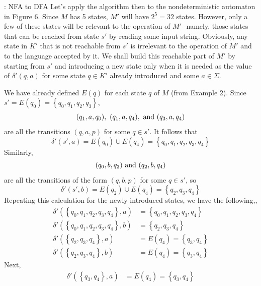 \begin{examplebreak}{: NFA to DFA}
  \quad Let's apply the algorithm then to the nondeterministic automaton in Figure 6. Since $M$ has 5 states, $M'$ will have $2^5 = 32$ states. However, only a few of these states will be relevant to the operation of $M'$ -namely, those states that can be reached from state $s'$ by reading some input string. Obviously, any state in $K'$ that is not reachable from $s'$ is irrelevant to the operation of $M'$ and to the language accepted by it. We shall build this reachable part of $M'$ by starting from $s'$ and introducing a new state only when it is needed as the value of $\delta'(q, a)$ for some state $q \in K'$ already introduced and some $a \in \Sigma$.
  
  \quad We have already defined $E(q)$ for each state $q$ of $M$ (from Example 2). Since $s' = E(q_0) = \left\{ q_0, q_1, q_2, q_3  \right\}$,
  \begin{equation*}
    (q_1, a, q_0),\ (q_1, a, q_4), \textnormal{ and } (q_3, a, q_4)
  \end{equation*}
  are all the transitions $(q, a, p)$ for some $q \in s'$. It follows that
  \begin{equation*}
    \delta'(s', a) = E(q_0) \cup E(q_4) = \left\{ q_0, q_1, q_2, q_3, q_4 \right\}
  \end{equation*}
  Similarly,
  \begin{equation*}
    (q_0, b, q_2) \textnormal{ and } (q_2, b, q_4)
  \end{equation*}
  are all the transitions of the form $(q, b, p)$ for some $q \in s'$, so
  \begin{equation*}
    \delta'(s', b) = E(q_2) \cup E(q_4) = \left\{ q_2, q_3, q_4 \right\}
  \end{equation*}
  Repeating this calculation for the newly introduced states, we have the following,,
  \begin{align*}
    \delta'(\left\{ q_0, q_1, q_2, q_3, q_4 \right\}, a) &= \left\{ q_0, q_1, q_2, q_3, q_4 \right\}\\
    \delta'(\left\{ q_0, q_1, q_2, q_3, q_4 \right\}, b) &= \left\{ q_2, q_3, q_4 \right\}\\
    \delta'(\left\{ q_2,q_3,q_4 \right\},a) &= E(q_4) = \left\{ q_3,q_4 \right\}\\
    \delta'(\left\{ q_2,q_3,q_4 \right\},b) &= E(q_4) = \left\{ q_3,q_4 \right\}
  \end{align*}
  Next,
  \begin{align*}
    \delta'(\left\{ q_3, q_4 \right\}, a) &= E(q_4) = \left\{ q_3, q_4 \right\}\\

\end{align*}
\end{examplebreak}
